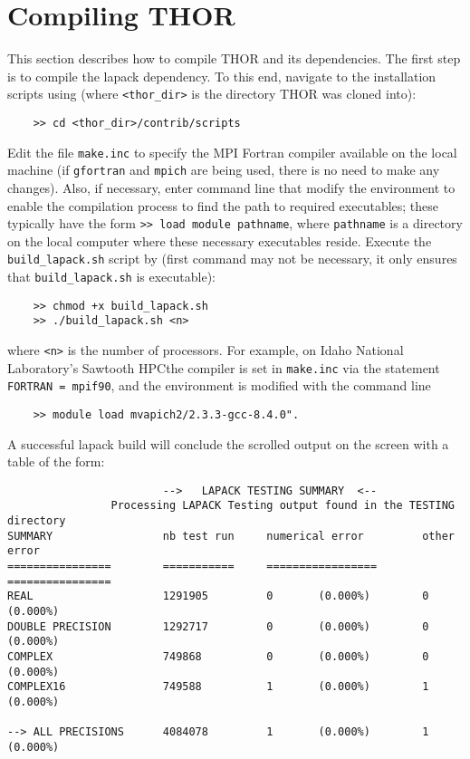 \section{Compiling THOR}
This section describes how to compile THOR and its dependencies.
The first step is to compile the lapack dependency.
To this end, navigate to the installation scripts using (where \verb"<thor_dir>" is the directory THOR was cloned into):
\begin{verbatim}
    >> cd <thor_dir>/contrib/scripts
\end{verbatim}
Edit the file \verb"make.inc" to specify the MPI Fortran compiler available on the local machine (if {\tt gfortran} and {\tt mpich} are being used, there is no need to make any changes).
Also, if necessary, enter command line that modify the environment to enable the compilation process to find the path to required executables; these typically have the form \verb">> load module pathname", where \verb"pathname" is a directory on the local computer where these necessary executables reside.
Execute the \verb"build_lapack.sh" script by (first command may not be necessary, it only ensures that \verb"build_lapack.sh" is executable):
\begin{verbatim}
    >> chmod +x build_lapack.sh
    >> ./build_lapack.sh <n>
\end{verbatim}
where \verb"<n>" is the number of processors.
For example, on Idaho National Laboratory's Sawtooth HPCthe compiler is set in \verb"make.inc" via the statement \verb"FORTRAN = mpif90", and the environment is  modified with the command line
\begin{verbatim}
    >> module load mvapich2/2.3.3-gcc-8.4.0".
\end{verbatim}
A successful lapack build will conclude the scrolled output on the screen with a table of the form:
\begin{verbatim}
                        -->   LAPACK TESTING SUMMARY  <--
                Processing LAPACK Testing output found in the TESTING directory
SUMMARY                 nb test run     numerical error         other error
================        ===========     =================       ================
REAL                    1291905         0       (0.000%)        0       (0.000%)
DOUBLE PRECISION        1292717         0       (0.000%)        0       (0.000%)
COMPLEX                 749868          0       (0.000%)        0       (0.000%)
COMPLEX16               749588          1       (0.000%)        1       (0.000%)

--> ALL PRECISIONS      4084078         1       (0.000%)        1       (0.000%)
\end{verbatim}

